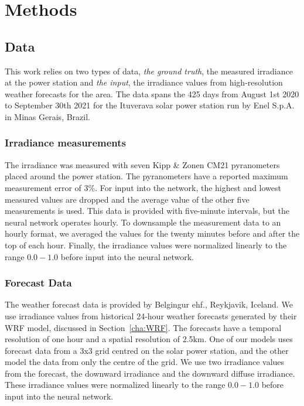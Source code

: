 \chapter{Methods}


\section{Data}
This work relies on two types of data, \emph{the ground truth}, the measured irradiance at the power station and \emph{the input}, the irradiance values from high-resolution weather forecasts for the area. The data spans the 425 days from August 1st 2020 to September 30th 2021 for the Ituverava solar power station run by Enel S.p.A. in Minas Gerais, Brazil.

\subsection{Irradiance measurements}
The irradiance was measured with seven Kipp \& Zonen CM21 pyranometers placed around the power station. The pyranometers have a reported maximum measurement error of 3\%. For input into the network, the highest and lowest measured values are dropped and the average value of the other five measurements is used. This data is provided with five-minute intervals, but the neural network operates hourly. To downsample the measurement data to an hourly format, we averaged the values for the twenty minutes before and after the top of each hour. Finally, the irradiance values were normalized linearly to the range $0.0-1.0$ before input into the neural network.
\newpage

\subsection{Forecast Data}
The weather forecast data is provided by Belgingur ehf., Reykjavik, Iceland. We use irradiance values from historical 24-hour weather forecasts generated by their WRF model, discussed in Section~\ref{cha:WRF}. The forecasts have a temporal resolution of one hour and a spatial resolution of 2.5km. One of our models uses forecast data from a 3x3 grid centred on the solar power station, and the other model the data from only the centre of the grid. We use two irradiance values from the forecast, the downward irradiance and the downward diffuse irradiance. These irradiance values were normalized linearly to the range $0.0-1.0$ before input into the neural network.


